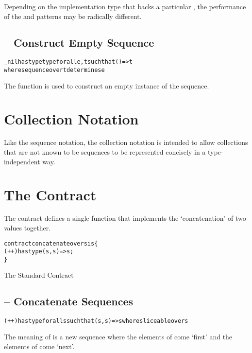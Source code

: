 \begin{aside}
Depending on the implementation type that backs a particular , the performance of the  and  patterns may be radically different.
\end{aside}

\subsection{ -- Construct Empty Sequence}
\label{newFunction}
\begin{alltt}
\_nil has type type for all e,t such that ()=>t
                    where sequence over t determines e
\end{alltt}
The  function is used to construct an empty instance of the sequence.

\section{Collection Notation}
Like the sequence notation, the collection notation is intended to allow collections that are not known to be sequences to be represented concisely in a type-independent way.

\section{The  Contract}
\label{concatenateContract}
The  contract defines a single function that implements the `concatenation' of two values together.

\begin{program}[H]
\begin{alltt}
contract concatenate over s is \{
  (++) has type (s,s)=>s;
\}
\end{alltt}
\caption{The Standard  Contract}\label{concatenateContractDef}
\end{program}
\noindent

\subsection{\q{++} -- Concatenate Sequences}
\label{concatFunction}
\begin{alltt}
(++) has type for all s such that (s,s)=>s where sliceable over s
\end{alltt}
The meaning of  is a new sequence where the elements of  come `first' and the elements of  come `next'.

